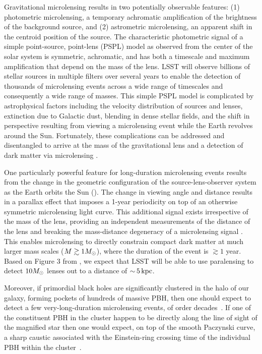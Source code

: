Gravitational microlensing results in two potentially observable features: (1) photometric microlensing, a temporary achromatic amplification of the brightness of the background source, and (2) astrometric microlensing, an apparent shift in the centroid position of the source.
The characteristic photometric signal of a simple point-source, point-lens (PSPL) model as observed from the center of the solar system is symmetric, achromatic, and has both a timescale and maximum amplification that depend on the mass of the lens.
LSST will observe billions of stellar sources in multiple filters over several years to enable the detection of thousands of microlensing events across a wide range of timescales and consequently a wide range of masses.
This simple PSPL model is complicated by astrophysical factors including the velocity distribution of sources and lenses, extinction due to Galactic dust, blending in dense stellar fields, and the shift in perspective resulting from viewing a microlensing event while the Earth revolves around the Sun.
Fortunately, these complications can be addressed and disentangled to arrive at the mass of the gravitational lens and a detection of dark matter via microlensing \citep{1405.3134,1509.04899}.

One particularly powerful feature for long-duration microlensing events results from the change in the geometric configuration of the source-lens-observer system as the Earth orbits the Sun ().
The change in viewing angle and distance results in a parallax effect that imposes a 1-year periodicity on top of an otherwise symmetric microlensing light curve.
This additional signal exists irrespective of the mass of the lens, providing an independent measurements of the distance of the lens and breaking the mass-distance degeneracy of a microlensing signal \citep[\eg][]{1509.04899}.
This enables microlensing to directly constrain compact dark matter at much larger mass scales ($M \gtrsim 1M_\odot$), where the duration of the event is $\gtrsim 1$ year. 
Based on Figure 3 from \citet{1509.04899}, we expect that LSST will be able to use paralensing to detect $10M_\odot$ lenses out to a distance of $ {\sim}\,5 \mathrm{\,kpc}$.

Moreover, if primordial black holes are significantly clustered in the halo of our galaxy, forming pockets of hundreds of massive PBH, then one should expect to detect a few very-long-duration microlensing events, of order decades~\citep{Bellido:2017}. If one of the constituent PBH in the cluster happen to be directly along the line of sight of the magnified star then one would expect, on top of the smooth Paczynski curve, a sharp caustic associated with the Einstein-ring crossing time of the individual PBH within the cluster~\citep{Bellido:2018}.

